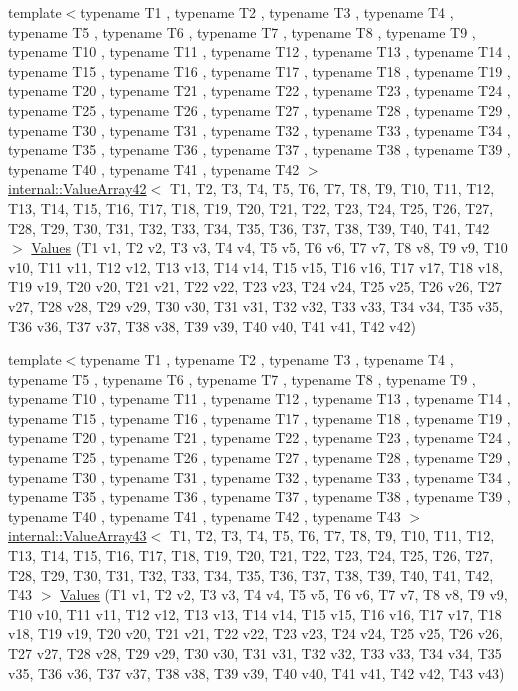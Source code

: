\begin{DoxyCompactItemize}
\item 
{\footnotesize template$<$typename T1 , typename T2 , typename T3 , typename T4 , typename T5 , typename T6 , typename T7 , typename T8 , typename T9 , typename T10 , typename T11 , typename T12 , typename T13 , typename T14 , typename T15 , typename T16 , typename T17 , typename T18 , typename T19 , typename T20 , typename T21 , typename T22 , typename T23 , typename T24 , typename T25 , typename T26 , typename T27 , typename T28 , typename T29 , typename T30 , typename T31 , typename T32 , typename T33 , typename T34 , typename T35 , typename T36 , typename T37 , typename T38 , typename T39 , typename T40 , typename T41 , typename T42 $>$ }\\\mbox{\hyperlink{classtesting_1_1internal_1_1_value_array42}{internal\+::\+Value\+Array42}}$<$ T1, T2, T3, T4, T5, T6, T7, T8, T9, T10, T11, T12, T13, T14, T15, T16, T17, T18, T19, T20, T21, T22, T23, T24, T25, T26, T27, T28, T29, T30, T31, T32, T33, T34, T35, T36, T37, T38, T39, T40, T41, T42 $>$ \mbox{\hyperlink{namespacetesting_a0951fc3989cde27914791eb120f8f01c}{Values}} (T1 v1, T2 v2, T3 v3, T4 v4, T5 v5, T6 v6, T7 v7, T8 v8, T9 v9, T10 v10, T11 v11, T12 v12, T13 v13, T14 v14, T15 v15, T16 v16, T17 v17, T18 v18, T19 v19, T20 v20, T21 v21, T22 v22, T23 v23, T24 v24, T25 v25, T26 v26, T27 v27, T28 v28, T29 v29, T30 v30, T31 v31, T32 v32, T33 v33, T34 v34, T35 v35, T36 v36, T37 v37, T38 v38, T39 v39, T40 v40, T41 v41, T42 v42)
\item 
{\footnotesize template$<$typename T1 , typename T2 , typename T3 , typename T4 , typename T5 , typename T6 , typename T7 , typename T8 , typename T9 , typename T10 , typename T11 , typename T12 , typename T13 , typename T14 , typename T15 , typename T16 , typename T17 , typename T18 , typename T19 , typename T20 , typename T21 , typename T22 , typename T23 , typename T24 , typename T25 , typename T26 , typename T27 , typename T28 , typename T29 , typename T30 , typename T31 , typename T32 , typename T33 , typename T34 , typename T35 , typename T36 , typename T37 , typename T38 , typename T39 , typename T40 , typename T41 , typename T42 , typename T43 $>$ }\\\mbox{\hyperlink{classtesting_1_1internal_1_1_value_array43}{internal\+::\+Value\+Array43}}$<$ T1, T2, T3, T4, T5, T6, T7, T8, T9, T10, T11, T12, T13, T14, T15, T16, T17, T18, T19, T20, T21, T22, T23, T24, T25, T26, T27, T28, T29, T30, T31, T32, T33, T34, T35, T36, T37, T38, T39, T40, T41, T42, T43 $>$ \mbox{\hyperlink{namespacetesting_a316b2e13e635215ac89a50315bb66d81}{Values}} (T1 v1, T2 v2, T3 v3, T4 v4, T5 v5, T6 v6, T7 v7, T8 v8, T9 v9, T10 v10, T11 v11, T12 v12, T13 v13, T14 v14, T15 v15, T16 v16, T17 v17, T18 v18, T19 v19, T20 v20, T21 v21, T22 v22, T23 v23, T24 v24, T25 v25, T26 v26, T27 v27, T28 v28, T29 v29, T30 v30, T31 v31, T32 v32, T33 v33, T34 v34, T35 v35, T36 v36, T37 v37, T38 v38, T39 v39, T40 v40, T41 v41, T42 v42, T43 v43)

\end{DoxyCompactItemize}

